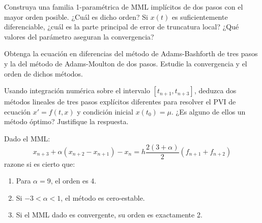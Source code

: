 \begin{ejercicio}\label{ej:3.1.13}
    Construya una familia 1-paramétrica de MML implícitos de dos pasos con el mayor orden posible. ¿Cuál es dicho orden? Si $x(t)$ es suficientemente diferenciable, ¿cuál es la parte principal de error de truncatura local? ¿Qué valores del parámetro aseguran la convergencia?
\end{ejercicio}

\begin{ejercicio}\label{ej:3.1.14}
    Obtenga la ecuación en diferencias del método de Adams-Bashforth de tres pasos y la del método de Adams-Moulton de dos pasos. Estudie la convergencia y el orden de dichos métodos.
\end{ejercicio}

\begin{ejercicio}\label{ej:3.1.15}
    Usando integración numérica sobre el intervalo $[t_{n+1}, t_{n+3}]$, deduzca dos métodos lineales de tres pasos explícitos diferentes para resolver el PVI de ecuación $x' = f(t, x)$ y condición inicial $x(t_0) = \mu$. ¿Es alguno de ellos un método óptimo? Justifique la respuesta.
\end{ejercicio}

\begin{ejercicio}\label{ej:3.1.16}
    Dado el MML:
    \begin{equation*}
        x_{n+3} + \alpha (x_{n+2} - x_{n+1}) - x_n = h \frac{2(3 + \alpha)}{2} (f_{n+1} + f_{n+2})
    \end{equation*}
    razone si es cierto que:
    \begin{enumerate}
        \item Para $\alpha = 9$, el orden es 4.
        \item Si $-3 < \alpha < 1$, el método es cero-estable.
        \item Si el MML dado es convergente, su orden es exactamente 2.
    \end{enumerate}
\end{ejercicio}

